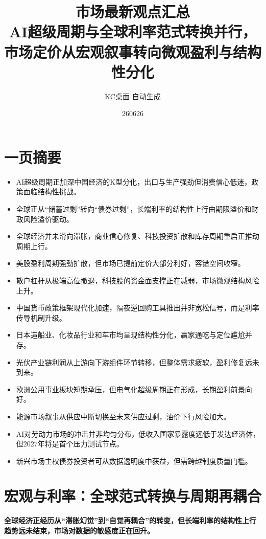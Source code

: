 \documentclass[11pt]{ctexart}
\title{\textbf{市场最新观点汇总}\\[0.4em]{\large AI超级周期与全球利率范式转换并行，市场定价从宏观叙事转向微观盈利与结构性分化}}
\author{KC桌面 自动生成}
\date{260626}
\begin{document}
\maketitle
\tableofcontents
\newpage
\section{一页摘要}
\begin{itemize}
  \item AI超级周期正加深中国经济的K型分化，出口与生产强劲但消费信心低迷，政策面临结构性挑战。
  \item 全球正从“储蓄过剩”转向“债券过剩”，长端利率的结构性上行由期限溢价和财政风险溢价驱动。
  \item 全球经济并未滑向滞胀，商业信心修复、科技投资扩散和库存周期重启正推动周期上行。
  \item 美股盈利周期强劲扩散，但市场已提前定价大部分利好，容错空间收窄。
  \item 散户杠杆从极端高位撤退，科技股的资金面支撑正在减弱，市场微观结构风险上升。
  \item 中国货币政策框架现代化加速，隔夜逆回购工具推出并非宽松信号，而是利率传导机制升级。
  \item 日本造船业、化妆品行业和车市均呈现结构性分化，赢家通吃与定位尴尬并存。
  \item 光伏产业链利润从上游向下游组件环节转移，但整体需求疲软，盈利修复远未到来。
  \item 欧洲公用事业板块短期承压，但电气化超级周期正在形成，长期盈利前景向好。
  \item 能源市场叙事从供应中断切换至未来供应过剩，油价下行风险加大。
  \item AI对劳动力市场的冲击并非均匀分布，低收入国家暴露度远低于发达经济体，但2027年将是首个压力测试节点。
  \item 新兴市场主权债券投资者可从数据透明度中获益，但需跨越制度质量门槛。
\end{itemize}
\section{宏观与利率：全球范式转换与周期再耦合}
\textbf{全球经济正经历从“滞胀幻觉”到“自觉再耦合”的转变，但长端利率的结构性上行趋势远未结束，市场对数据的敏感度正在回升。}
\end{document}
